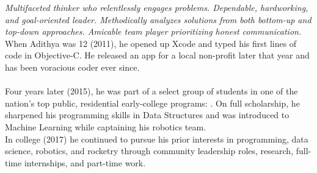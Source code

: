 
\begin{multicols}{2}  %
	\noindent
	\emph{Multifaceted thinker who relentlessly engages problems.
		Dependable, hardworking, and goal-oriented leader.
		Methodically analyzes solutions from both bottom-up and top-down approaches. Amicable team player prioritizing honest communication.
	}
	When Adithya was 12 (2011), he opened up Xcode and typed his first lines of code in Objective-C.
	He released an  app for a local non-profit later that year and has been voracious coder ever since.\\ \\

	Four years later (2015), he was part of a select group of students in one of the nation's top public, residential early-college programs: .
	On full scholarship, he sharpened his programming skills in Data Structures and was introduced to Machine Learning while captaining his robotics team.\\

	In college (2017) he continued to pursue his prior interests in programming, data science, robotics, and rocketry through community leadership roles, research, full-time internships, and part-time work.
\end{multicols}